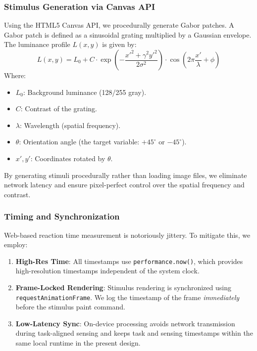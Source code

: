 \documentclass[final,3p,times,twocolumn]{elsarticle}
\begin{document}
\subsubsection{Stimulus Generation via Canvas API}
Using the HTML5 Canvas API, we procedurally generate Gabor patches. A Gabor patch is defined as a sinusoidal grating multiplied by a Gaussian envelope.
The luminance profile $L(x,y)$ is given by:
\begin{equation}
    L(x,y) = L_0 + C \cdot \exp\left(-\frac{x'^2 + \gamma^2 y'^2}{2\sigma^2}\right) \cdot \cos\left(2\pi \frac{x'}{\lambda} + \phi\right)
\end{equation}
Where:
\begin{itemize}
    \item $L_0$: Background luminance (128/255 gray).
    \item $C$: Contrast of the grating.
    \item $\lambda$: Wavelength (spatial frequency).
    \item $\theta$: Orientation angle (the target variable: $+45^\circ$ or $-45^\circ$).
    \item $x', y'$: Coordinates rotated by $\theta$.
\end{itemize}
By generating stimuli procedurally rather than loading image files, we eliminate network latency and ensure pixel-perfect control
over the spatial frequency and contrast.

\subsubsection{Timing and Synchronization}
Web-based reaction time measurement is notoriously jittery. To mitigate this, we employ:
\begin{enumerate}
    \item \textbf{High-Res Time}: All timestamps use \texttt{performance.now()}, which provides high-resolution timestamps independent of the system clock.
    \item \textbf{Frame-Locked Rendering}: Stimulus rendering is synchronized using \texttt{requestAnimationFrame}.
    We log the timestamp of the frame \textit{immediately} before the stimulus paint command.
    \item \textbf{Low-Latency Sync}: On-device processing avoids network transmission during task-aligned sensing and keeps task and sensing timestamps within the same local runtime in the present design.
\end{enumerate}
\end{document}

